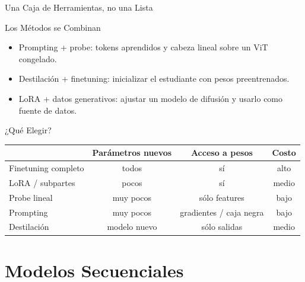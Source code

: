 \documentclass[aspectratio=169, 10pt]{beamer}
\begin{document}
\begin{frame}[shrink]{Una Caja de Herramientas, no una Lista}

	\begin{block}{Los M\'etodos se Combinan}
		\begin{itemize}
			\item Prompting + probe: tokens aprendidos y cabeza lineal sobre un ViT congelado.
			\item Destilaci\'on + finetuning: inicializar el estudiante con pesos preentrenados.
			\item LoRA + datos generativos: ajustar un modelo de difusi\'on y usarlo como fuente de datos.
		\end{itemize}
	\end{block}

	\vspace{0.3cm}

	\begin{block}{¿Qu\'e Elegir?}
		\small
		\begin{center}
			\renewcommand{\arraystretch}{1.3}
			\begin{tabular}{lccc}
				\toprule
				& \textbf{Par\'ametros nuevos} & \textbf{Acceso a pesos} & \textbf{Costo} \\
				\midrule
				Finetuning completo & todos & s\'i & alto \\
				LoRA / subpartes & pocos & s\'i & medio \\
				Probe lineal & muy pocos & s\'olo features & bajo \\
				Prompting & muy pocos & gradientes / caja negra & bajo \\
				Destilaci\'on & modelo nuevo & s\'olo salidas & medio \\
				\bottomrule
			\end{tabular}
		\end{center}
	\end{block}

\end{frame}

\section{Modelos Secuenciales}
\end{document}
